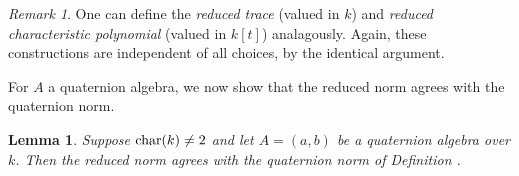 \documentclass[11pt]{amsart}
\numberwithin{equation}{section}
\newtheorem{lemma}[equation]{Lemma}
\theoremstyle{remark}
\newtheorem{remark}[equation]{Remark}
\theoremstyle{remark}
\theoremstyle{remark}
\theoremstyle{definition}
\theoremstyle{definition}
\theoremstyle{definition}
\theoremstyle{definition}
\theoremstyle{definition}
\theoremstyle{definition}
\begin{document}

\begin{remark}
One can define the \textit{reduced trace} (valued in $k$) and \textit{reduced characteristic polynomial} (valued in $k[t]$) analagously. Again, these constructions are independent of all choices, by the identical argument.
\end{remark}

For $A$ a quaternion algebra, we now show that the reduced norm agrees with the quaternion norm.

\begin{lemma} \label{quaternion norm comparison}
Suppose $\textup{char}(k)\neq 2$ and let $A=(a,b)$ be a quaternion algebra over $k$. Then the reduced norm agrees with the quaternion norm of Definition .
\end{lemma}
\end{document}
